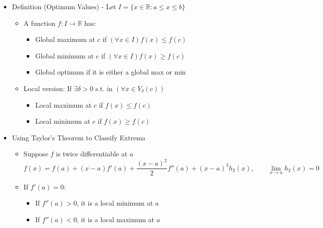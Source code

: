 \documentclass{article}
\begin{document}
\begin{itemize}
    \begin{itemize}
        \item $f'(x) = 3x^2 - 1 \Rightarrow f'(\pm \frac{1}{\sqrt{3}}) = 0$
        \item $f(a) + (x-a)\underset{0}{\underbrace{f'(a)}} + \frac{(x-a)^2}{2!} f''(a) = f(a) + \frac{(x-a)^2}{2!}f''(a) = \frac{1}{\sqrt{3}}(\frac{1}{3}-1) + \frac{(x-\frac{1}{\sqrt{3}})^2}{2} \frac{6}{\sqrt{3}}$
        \item Since $f''(a) = \frac{6}{\sqrt{3}} > 0$ for all $x$, $x=a$ is a local minimum
    \end{itemize}
    \item Definition (Optimum Values) - Let $I = \{ x \in \mathbb{R} : a \le x \le b \}$
    \begin{itemize}
        \item A function $f : I \rightarrow \mathbb{R}$ has:
        \begin{itemize}
            \item Global maximum at $c$ if $(\forall x \in I) f(x) \le f(c)$
            \item Global minimum at $c$ if $(\forall x \in I) f(x) \ge f(c)$
            \item Global optimum if it is either a global max or min
        \end{itemize}
        \item Local version: If $\exists \delta > 0$ s.t. in $(\forall x \in V_\delta(c))$
        \begin{itemize}
            \item Local maximum at $c$ if $f(x) \le f(c)$
            \item Local minimum at $c$ if $f(x) \ge f(c)$
        \end{itemize}
    \end{itemize}
    \item Using Taylor's Theorem to Classify Extrema
    \begin{itemize}
        \item Suppose $f$ is twice differentiable at $a$
        \[
        f(x) = f(a) + (x-a)f'(a) + \frac{(x-a)^2}{2} f''(a) + (x-a)^3 h_2(x), \qquad \lim_{x \rightarrow a} h_2(x) = 0
        \]
        \item If $f'(a) = 0$:
        \begin{itemize}
            \item If $f''(a) > 0$, it is a local minimum at $a$
            \item If $f''(a) < 0$, it is a local maximum at $a$

\end{itemize}
\end{itemize}
\end{itemize}
\end{document}
